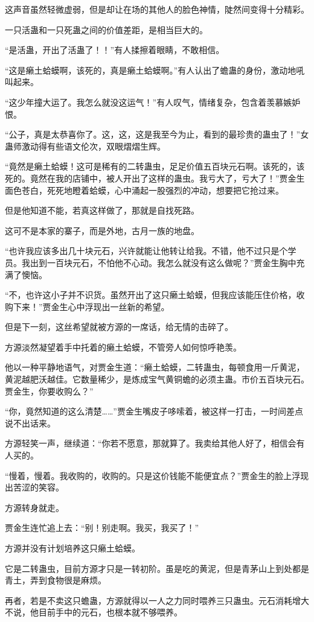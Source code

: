 \begin{this_body}
这声音虽然轻微虚弱，但是却让在场的其他人的脸色神情，陡然间变得十分精彩。

一只活蛊和一只死蛊之间的价值差距，是相当巨大的。

“是活蛊，开出了活蛊了！！”有人揉擦着眼睛，不敢相信。

“这是癞土蛤蟆啊，该死的，真是癞土蛤蟆啊。”有人认出了蟾蛊的身份，激动地吼叫起来。

“这少年撞大运了。我怎么就没这运气！”有人叹气，情绪复杂，包含着羡慕嫉妒恨。

“公子，真是太恭喜你了。这，这，这是我至今为止，看到的最珍贵的蛊虫了！”女蛊师激动得有些语文伦次，双眼熠熠生辉。

“竟然是癞土蛤蟆！这可是稀有的二转蛊虫，足足价值五百块元石啊。该死的，该死的。竟然在我的店铺中，被人开出了这样的蛊虫。我亏大了，亏大了！”贾金生面色苍白，死死地瞪着蛤蟆，心中涌起一股强烈的冲动，想要把它抢过来。

但是他知道不能，若真这样做了，那就是自找死路。

这可不是本家的寨子，而是外地，古月一族的地盘。

“也许我应该多出几十块元石，兴许就能让他转让给我。不错，他不过只是个学员。我出到一百块元石，不怕他不心动。我怎么就没有这么做呢？”贾金生胸中充满了懊恼。

“不，也许这小子并不识货。虽然开出了这只癞土蛤蟆，但我应该能压住价格，收购下来！”贾金生心中浮现出一丝新的希望。

但是下一刻，这丝希望就被方源的一席话，给无情的击碎了。

方源淡然凝望着手中托着的癞土蛤蟆，不管旁人如何惊呼艳羡。

他以一种平静地语气，对贾金生道：“癞土蛤蟆，二转蛊虫，每顿食用一斤黄泥，黄泥越肥沃越佳。它数量稀少，是炼成宝气黄铜蟾的必须主蛊。市价五百块元石。贾金生，你要收购么？”

“你，竟然知道的这么清楚……”贾金生嘴皮子哆嗦着，被这样一打击，一时间差点说不出话来。

方源轻笑一声，继续道：“你若不愿意，那就算了。我卖给其他人好了，相信会有人买的。

“慢着，慢着。我收购的，收购的。只是这价钱能不能便宜点？”贾金生的脸上浮现出苦涩的笑容。

方源转身就走。

贾金生连忙追上去：“别！别走啊。我买，我买了！”

方源并没有计划培养这只癞土蛤蟆。

它是二转蛊虫，目前方源才只是一转初阶。虽是吃的黄泥，但是青茅山上到处都是青土，弄到食物很是麻烦。

再者，若是不卖这只蟾蛊，方源就得以一人之力同时喂养三只蛊虫。元石消耗增大不说，他目前手中的元石，也根本就不够喂养。


\end{this_body}
